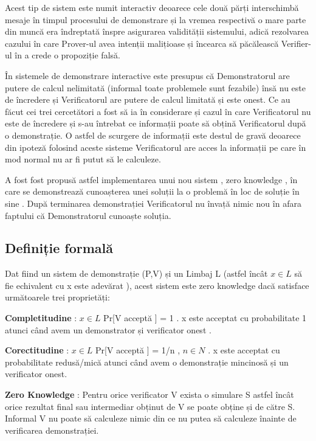 \documentclass[12pt, letterpaper]{article}
\begin{document}
    Acest tip de sistem este numit interactiv deoarece cele două părți interschimbă mesaje în timpul procesului de demonstrare și la vremea respectivă o mare parte din muncă era îndreptată înspre asigurarea validității sistemului, adică rezolvarea cazului în care Prover-ul avea intenții malițioase și încearca să păcălească Verifier-ul în a crede o propoziție falsă.

	În sistemele de demonstrare interactive este presupus că Demonstratorul are putere de calcul nelimitată (informal toate problemele sunt fezabile) însă nu este de încredere și Verificatorul are putere de calcul limitată și este onest. Ce au făcut cei trei cercetători a fost să ia în considerare și cazul în care Verificatorul nu este de încredere și s-au întrebat ce informații poate să obțină Verificatorul după o demonstrație. O astfel de scurgere de informații este destul de gravă deoarece din ipoteză folosind aceste sisteme Verificatorul are acces la informații pe care în mod normal nu ar fi putut să le calculeze. 

	A fost fost propusă astfel implementarea unui nou sistem , zero knowledge , în care se demonstrează cunoașterea unei soluții la o problemă în loc de soluție în sine . După terminarea demonstrației Verificatorul nu învață nimic nou în afara faptului că Demonstratorul cunoaște soluția.\cite{greenandblazewebsite}

 \subsection{Definiție formală}
 
 Dat fiind un sistem de demonstrație (P,V) și un Limbaj L (astfel încât $x\in L$ să fie echivalent cu x este adevărat ), acest sistem este zero knowledge dacă satisface următoarele trei proprietăți: 


\textbf{Completitudine} : $x\in L$  Pr[V acceptă ] = 1 . x este acceptat cu probabilitate 1 atunci când avem un demonstrator și verificator onest  .


\textbf{Corectitudine} : $x\in L$  Pr[V acceptă ] = 1/n , $n\in N$ . x este acceptat cu probabilitate redusă/mică  atunci când avem o demonstrație mincinosă și un verificator onest.


\textbf{Zero Knowledge} : Pentru orice verificator V exista o simulare S astfel încât orice rezultat final sau intermediar obținut de V se poate obține și de către S. Informal V nu poate să calculeze nimic din ce nu putea să calculeze înainte de verificarea demonstrației.

\printbibliography
\end{document}
